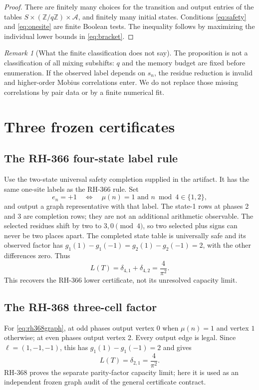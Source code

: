 \documentclass[11pt]{article}
\theoremstyle{definition}
\theoremstyle{remark}
\newtheorem{remark}[theorem]{Remark}
\newcommand{\Mob}{\mu}
\newcommand{\ellobs}{\ell}
\begin{document}
\begin{proof}
There are finitely many choices for the transition and output entries of
the tables \(S\times(\mathbb Z/q\mathbb Z)\times\mathcal A\), and finitely
many initial states.  Conditions \eqref{eq:safety} and \eqref{eq:onesite}
are finite Boolean tests.  The inequality follows by maximizing the
individual lower bounds in \eqref{eq:bracket}.
\end{proof}

\begin{remark}[What the finite classification does not say]
The proposition is not a classification of all mixing subshifts: \(q\) and
the memory budget are fixed before enumeration.  If the observed label
depends on \(s_n\), the residue reduction is invalid and higher-order Mobius
correlations enter.  We do not replace those missing correlations by pair
data or by a finite numerical fit.
\end{remark}

\section{Three frozen certificates}

\subsection{The RH-366 four-state label rule}
Use the two-state universal safety completion supplied in the artifact.  It
has the same one-site labels as the RH-366 rule.  Set
\[
 e_n=+1\quad\Longleftrightarrow\quad
 \Mob(n)=1\text{ and }n\bmod4\in\{1,2\},
\]
and output a graph representative with that label.  The state-1 rows at
phases 2 and 3 are completion rows; they are not an additional arithmetic
observable.  The selected residues shift by two to \(3,0\pmod4\), so two
selected plus signs can never be two places apart.  The completed state table
is universally safe and its observed factor has
\(g_1(1)-g_1(-1)=g_2(1)-g_2(-1)=2\), with the other differences zero.
Thus
\[
 L(T)=\delta_{4,1}+\delta_{4,2}=\frac4{\pi^2}.
\]
This recovers the RH-366 lower certificate, not its unresolved capacity
limit.

\subsection{The RH-368 three-cell factor}
For \eqref{eq:rh368graph}, at odd phases output vertex \(0\) when
\(\Mob(n)=1\) and vertex \(1\) otherwise; at even phases output vertex
2.  Every output edge is legal.  Since \(\ellobs=(1,-1,-1)\), this has
\(g_1(1)-g_1(-1)=2\) and gives
\[
 L(T)=\delta_{2,1}=\frac4{\pi^2}.
\]
RH-368 proves the separate parity-factor capacity limit; here it is used as
an independent frozen graph audit of the general certificate contract.
\end{document}
